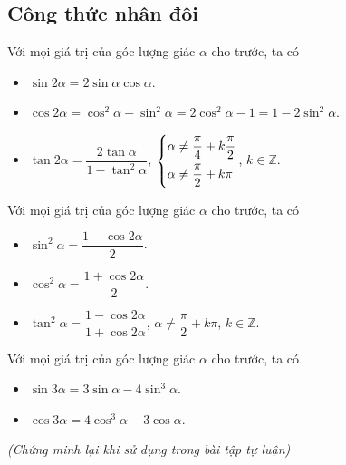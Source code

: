\subsection{Công thức nhân đôi}
\begin{dl}
	Với mọi giá trị của góc lượng giác $\alpha$ cho trước, ta có
	\begin{itemize}
		\item $\sin2\alpha=2\sin\alpha\cos\alpha$.
		\item $\cos2\alpha=\cos^2\alpha-\sin^2\alpha=2\cos^2\alpha-1=1-2\sin^2\alpha$.
		\item $\tan2\alpha=\dfrac{2\tan\alpha}{1-\tan^2\alpha}$, $\left\{\begin{aligned}&\alpha\ne\dfrac{\pi}{4}+k\dfrac{\pi}{2}\\&\alpha\ne\dfrac{\pi}{2}+k\pi\end{aligned}\right.$, $k\in\mathbb{Z}$.
	\end{itemize}
\end{dl}
\begin{hq}
	Với mọi giá trị của góc lượng giác $\alpha$ cho trước, ta có
	\begin{itemize}
		\item $\sin^2\alpha=\dfrac{1-\cos2\alpha}{2}$.
		\item $\cos^2\alpha=\dfrac{1+\cos2\alpha}{2}$.
		\item $\tan^2\alpha=\dfrac{1-\cos2\alpha}{1+\cos2\alpha}$, $\alpha\ne\dfrac{\pi}{2}+k\pi$, $k\in\mathbb{Z}$.
	\end{itemize}
\end{hq}
\begin{hq}
	Với mọi giá trị của góc lượng giác $\alpha$ cho trước, ta có
	\begin{multicols}{2}
		\begin{itemize}
			\item $\sin3\alpha=3\sin\alpha-4\sin^3\alpha$.
			\item $\cos3\alpha=4\cos^3\alpha-3\cos\alpha$.
		\end{itemize}
	\end{multicols}
	\begin{center}
		\textit{(Chứng minh lại khi sử dụng trong bài tập tự luận)}
	\end{center}
\end{hq}
